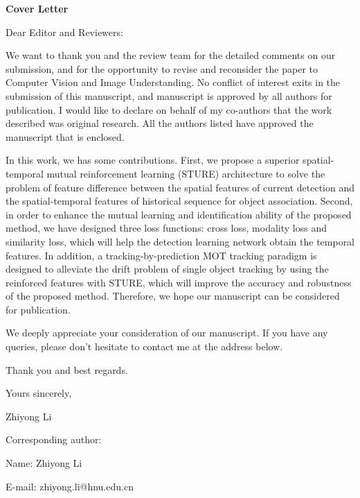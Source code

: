 \documentclass[11pt,journal,onecolumn,draft]{IEEEtran}
\begin{document}
\begin{center}
	\textbf{\LARGE Cover Letter} 
\end{center}
\vspace{8pt} 
Dear Editor and Reviewers:

\hspace{1em} We want to thank you and the review team for the detailed comments on our submission, and for the opportunity to revise and reconsider the paper to Computer Vision and Image Understanding.  
No conflict of interest exits in the submission of this manuscript, and manuscript is approved by all authors for publication.  
I would like to declare on behalf of my co-authors that the work described was original research. 
All the authors listed have approved the manuscript that is enclosed. 

In this work, we has some contributions.
First, we propose a superior spatial-temporal mutual reinforcement learning (STURE) architecture to solve the problem of feature difference between the spatial features of current detection and the spatial-temporal features of historical sequence for object association.
Second, in order to enhance the mutual learning and identification ability of the proposed method, we have designed three loss functions: cross loss, modality loss and similarity loss, which will help the detection learning network obtain the temporal features.
In addition, a tracking-by-prediction MOT tracking paradigm is designed to alleviate the drift problem of single object tracking by using the reinforced features with STURE, which will improve the accuracy and robustness of the proposed method. 
Therefore, we hope our manuscript can be considered for publication. 

\hspace{1em} We deeply appreciate your consideration of our manuscript.
If you have any queries, please don’t hesitate to contact me at the address below.

\hspace{1em} Thank you and best regards.

\hspace{1em} Yours sincerely,

\hspace{1em} Zhiyong Li
\vspace{20pt} 

Corresponding author:

Name: Zhiyong Li 

E-mail: zhiyong.li@hnu.edu.cn 
\end{document}
